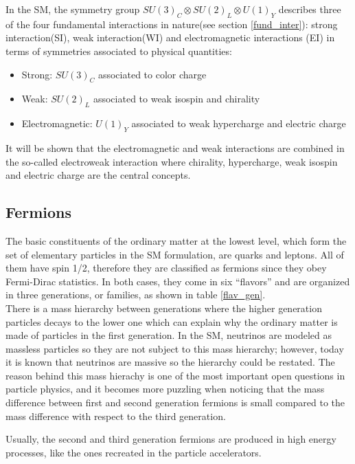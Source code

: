 \noindent In the SM, the symmetry group $SU(3)_C\otimes SU(2)_L\otimes U(1)_Y$ describes three of the four fundamental interactions in nature(see section \ref{fund_inter}): strong interaction(SI), weak interaction(WI) and electromagnetic interactions (EI) in terms of symmetries associated to physical quantities:
\begin{itemize}
\item Strong: $SU(3)_C$ associated to color charge
\item Weak: $SU(2)_L$ associated to weak isospin and chirality
\item Electromagnetic: $U(1)_Y$ associated to weak hypercharge and electric charge
\end{itemize}

\noindent It will be shown that the electromagnetic and weak interactions are combined in the so-called electroweak interaction where chirality, hypercharge, weak isospin and electric charge are the central concepts.

\subsection{Fermions}\label{fermions}

\noindent The basic constituents of the ordinary matter at the lowest level, which form the set of elementary particles in the SM formulation, are quarks and leptons. All of them have spin 1/2, therefore they are classified as fermions since they obey Fermi-Dirac statistics. In both cases, they come in six ``flavors'' and are organized in three generations, or families, as shown in table \ref{flav_gen}.\\

\noindent There is a mass hierarchy between generations where the higher generation particles decays to the lower one which can explain why the ordinary matter is made of particles in the first generation. In the SM, neutrinos are modeled as massless particles so they are not subject to this mass hierarchy; however, today it is known that neutrinos are massive so the hierarchy could be restated. The reason behind this mass hierachy is one of the most important open questions in particle physics, and it becomes more puzzling when noticing that the mass difference between first and second generation fermions is small compared to the mass difference with respect to the third generation.

\noindent Usually, the second and third generation fermions are produced in high energy processes, like the ones recreated in the particle accelerators.         
 
